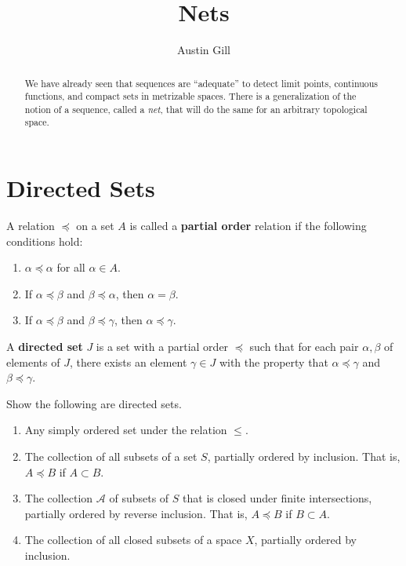 \documentclass[12pt]{article}
\title{Nets}
\author{Austin Gill}
\begin{document}
\maketitle

\begin{abstract}
	We have already seen that sequences are ``adequate'' to detect limit points, continuous functions, and compact sets in metrizable spaces. There is a generalization of the notion of a sequence, called a \textit{net}, that will do the same for an arbitrary topological space.
\end{abstract}

\section{Directed Sets}
\begin{defn}
	A relation $\preceq$ on a set $A$ is called a \textbf{partial order} relation if the following conditions hold:
	\begin{enumerate}
		\item $\alpha \preceq \alpha$ for all $\alpha \in A$.
		\item If $\alpha \preceq \beta$ and $\beta \preceq \alpha$, then $\alpha = \beta$.
		\item If $\alpha \preceq \beta$ and $\beta \preceq \gamma$, then $\alpha \preceq \gamma$.
	\end{enumerate}
\end{defn}

\begin{defn}
	A \textbf{directed set} $J$ is a set with a partial order $\preceq$ such that for each pair $\alpha, \beta$ of elements of $J$, there exists an element $\gamma \in J$ with the property that $\alpha \preceq \gamma$ and $\beta \preceq \gamma$.
\end{defn}
Show the following are directed sets.

\begin{enumerate}
	\item Any simply ordered set under the relation $\leq$.
	\item The collection of all subsets of a set $S$, partially ordered by inclusion. That is, $A \preceq B$ if $A \subset B$.
	\item The collection $\mathscr A$ of subsets of $S$ that is closed under finite intersections, partially ordered by reverse inclusion. That is, $A \preceq B$ if $B \subset A$.
	\item The collection of all closed subsets of a space $X$, partially ordered by inclusion.
\end{enumerate}
\end{document}
